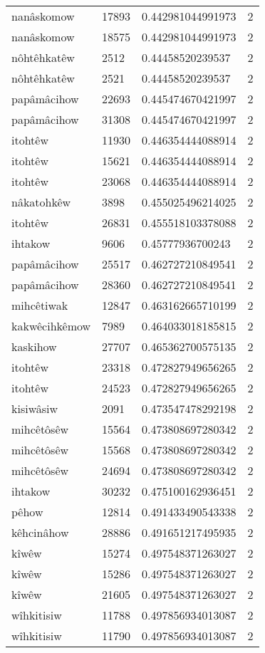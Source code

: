 \begin{longtable}{llll}
nanâskomow & 17893 & 0.442981044991973 & 2 \\
nanâskomow & 18575 & 0.442981044991973 & 2 \\
nôhtêhkatêw & 2512 & 0.44458520239537 & 2 \\
nôhtêhkatêw & 2521 & 0.44458520239537 & 2 \\
papâmâcihow & 22693 & 0.445474670421997 & 2 \\
papâmâcihow & 31308 & 0.445474670421997 & 2 \\
itohtêw & 11930 & 0.446354444088914 & 2 \\
itohtêw & 15621 & 0.446354444088914 & 2 \\
itohtêw & 23068 & 0.446354444088914 & 2 \\
nâkatohkêw & 3898 & 0.455025496214025 & 2 \\
itohtêw & 26831 & 0.455518103378088 & 2 \\
ihtakow & 9606 & 0.45777936700243 & 2 \\
papâmâcihow & 25517 & 0.462727210849541 & 2 \\
papâmâcihow & 28360 & 0.462727210849541 & 2 \\
mihcêtiwak & 12847 & 0.463162665710199 & 2 \\
kakwêcihkêmow & 7989 & 0.464033018185815 & 2 \\
kaskihow & 27707 & 0.465362700575135 & 2 \\
itohtêw & 23318 & 0.472827949656265 & 2 \\
itohtêw & 24523 & 0.472827949656265 & 2 \\
kisiwâsiw & 2091 & 0.473547478292198 & 2 \\
mihcêtôsêw & 15564 & 0.473808697280342 & 2 \\
mihcêtôsêw & 15568 & 0.473808697280342 & 2 \\
mihcêtôsêw & 24694 & 0.473808697280342 & 2 \\
ihtakow & 30232 & 0.475100162936451 & 2 \\
pêhow & 12814 & 0.491433490543338 & 2 \\
kêhcinâhow & 28886 & 0.491651217495935 & 2 \\
kîwêw & 15274 & 0.497548371263027 & 2 \\
kîwêw & 15286 & 0.497548371263027 & 2 \\
kîwêw & 21605 & 0.497548371263027 & 2 \\
wîhkitisiw & 11788 & 0.497856934013087 & 2 \\
wîhkitisiw & 11790 & 0.497856934013087 & 2 \\

\end{longtable}
